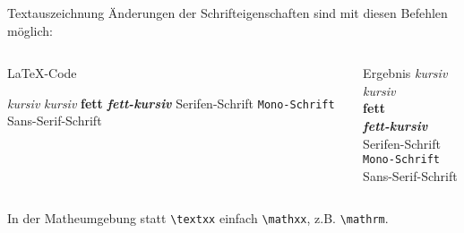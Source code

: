 \begin{frame}[fragile]{Textauszeichnung}
  Änderungen der Schrifteigenschaften sind mit diesen Befehlen möglich:
  \begin{columns}[t]
    \begin{column}{0.6\textwidth}
      \begin{block}{\LaTeX-Code}
        \begin{lstverbatim}
        \textit{kursiv} \emph{kursiv}
        \textbf{fett}
        \textbf{\textit{fett-kursiv}}
        \textrm{Serifen-Schrift}
        \texttt{Mono-Schrift}
        \textsf{Sans-Serif-Schrift}
        \end{lstverbatim}
      \end{block}
    \end{column}
    \begin{column}{0.35\textwidth}
      \begin{block}{Ergebnis}
        \textit{kursiv} \emph{kursiv} \\
        \textbf{fett} \\
        \textbf{\textit{fett-kursiv}} \\
        \textrm{Serifen-Schrift} \\
        \texttt{Mono-Schrift} \\
        \textsf{Sans-Serif-Schrift}
      \end{block}
    \end{column}
  \end{columns}
  \vspace{1em}
  In der Matheumgebung statt \verb+\textxx+ einfach \verb+\mathxx+, z.B. \verb+\mathrm+.
\end{frame}

